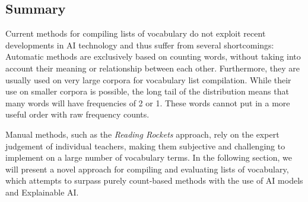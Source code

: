 \subsection{Summary} \label{sec:ranking-vocab-lists-summary}
Current methods for compiling lists of vocabulary do not exploit recent developments in AI technology and thus suffer from several shortcomings:
Automatic methods are exclusively based on counting words, without taking into account their meaning or relationship between each other.
Furthermore, they are usually used on very large corpora for vocabulary list compilation.
While their use on smaller corpora is possible, the long tail of the distribution means that many words will have frequencies of 2 or 1.
These words cannot put in a more useful order with raw frequency counts.

Manual methods, such as the \textit{Reading Rockets} approach, rely on the expert judgement of individual teachers, making them subjective and challenging to implement on a large number of vocabulary terms.
In the following section, we will present a novel approach for compiling and evaluating lists of vocabulary, which attempts to surpass purely count-based methods with the use of AI models and Explainable AI.



